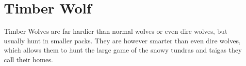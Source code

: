 \section{Timber Wolf}

Timber Wolves are far hardier than normal wolves or even dire wolves, but usually hunt in smaller packs. They are however smarter than even dire wolves, which allows them to hunt the large game of the snowy tundras and taigas they call their homes.